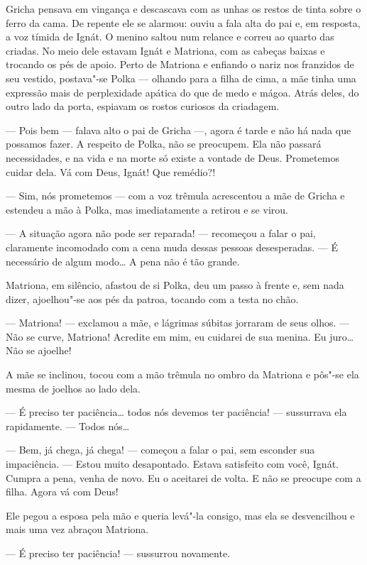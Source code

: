 Gricha pensava em vingança e descascava com as unhas os restos de tinta
sobre o ferro da cama. De repente ele se alarmou: ouviu a fala alta do
pai e, em resposta, a voz tímida de Ignát. O menino saltou num relance e
correu ao quarto das criadas. No meio dele estavam Ignát e Matriona, com
as cabeças baixas e trocando os pés de apoio. Perto de Matriona e
enfiando o nariz nos franzidos de seu vestido, postava"-se Polka ---
olhando para a filha de cima, a mãe tinha uma expressão mais de
perplexidade apática do que de medo e mágoa. Atrás deles, do outro lado
da porta, espiavam os rostos curiosos da criadagem.

--- Pois bem --- falava alto o pai de Gricha ---, agora é tarde e não há
nada que possamos fazer. A respeito de Polka, não se preocupem. Ela não
passará necessidades, e na vida e na morte só existe a vontade de Deus.
Prometemos cuidar dela. Vá com Deus, Ignát! Que remédio?!

--- Sim, nós prometemos --- com a voz trêmula acrescentou a mãe de
Gricha e estendeu a mão à Polka, mas imediatamente a retirou e se virou.

--- A situação agora não pode ser reparada! --- recomeçou a falar o pai,
claramente incomodado com a cena muda dessas pessoas desesperadas. --- É
necessário de algum modo\ldots{} A pena não é tão grande.

Matriona, em silêncio, afastou de si Polka, deu um passo à frente e, sem
nada dizer, ajoelhou"-se aos pés da patroa, tocando com a testa no chão.

--- Matriona! --- exclamou a mãe, e lágrimas súbitas jorraram de seus
olhos. --- Não se curve, Matriona! Acredite em mim, eu cuidarei de sua
menina. Eu juro\ldots{} Não se ajoelhe!

A mãe se inclinou, tocou com a mão trêmula no ombro da Matriona e pôs"-se
ela mesma de joelhos ao lado dela.

--- É preciso ter paciência\ldots{} todos nós devemos ter paciência! ---
sussurrava ela rapidamente. --- Todos nós\ldots{}

--- Bem, já chega, já chega! --- começou a falar o pai, sem esconder sua
impaciência. --- Estou muito desapontado. Estava satisfeito com você,
Ignát. Cumpra a pena, venha de novo. Eu o aceitarei de volta. E não se
preocupe com a filha. Agora vá com Deus!

Ele pegou a esposa pela mão e queria levá"-la consigo, mas ela se
desvencilhou e mais uma vez abraçou Matriona.

--- É preciso ter paciência! --- sussurrou novamente.

